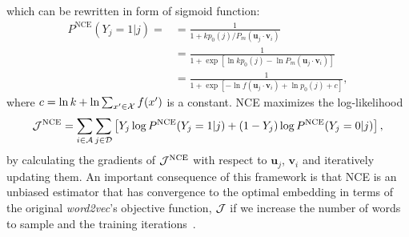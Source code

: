 \documentclass[12pt,a4paper]{article}
\newcommand{\vect}[1]{\boldsymbol{#1}}
\begin{document}
which can be rewritten in form of sigmoid function:
\begin{align}
	\label{eq:nce}
	P^{\text{NCE}}\left(Y_{j}=1 \vert j\right) =
	 & = \frac{
		1
	}{
		1 + kp_0(j) / P_m(\vect{u}_j \cdot \vect{v}_{i})
	}           \\
	 & = \frac{
		1
	}{
		1 + \exp\left[ \ln kp_0(j) - \ln P_m(\vect{u}_j \cdot \vect{v}_{i}) \right]
	}           \\
	 & = \frac{
		1
	}{
		1 + \exp\left[ - \ln f(\vect{u}_j \cdot \vect{v}_{i})  + \ln p_0(j) + c \right]
	},
\end{align}
where $c = \ln k + \ln\sum_{ x' \in {\cal X}} f(x') $ is a constant.
NCE maximizes the log-likelihood
\begin{align}
	\label{eq:log-likelihood-logistic-regress}
	{\cal J}^{\text{NCE}} = \sum_{i \in {\cal A}}\sum_{j \in {\cal D}} \left[ Y_{j} \log P^{\text{NCE}}(Y_{j} = 1\vert j) + (1-Y_{j}) \log P^{\text{NCE}}(Y_{j} = 0 \vert j)\right],
\end{align}
by calculating the gradients of ${\cal J}^{\text{NCE}}$ with respect to $\vect{u}_j$, $\vect{v}_{i}$ and iteratively updating them.
An important consequence of this framework is that NCE is an unbiased estimator that has convergence to the optimal embedding in terms of the original {\it word2vec}'s objective function, ${\cal J}$ if we increase the number of words to sample and the training iterations~\autocite{Chia2010,Dyer2014}.
\end{document}
